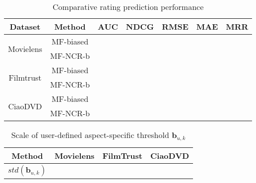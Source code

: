 \documentclass[letterpaper]{article} %
\begin{document}
\begin{table}[htp]
\tiny
\caption{Comparative rating prediction performance}
\begin{center}
\begin{tabular}{|c|c|c|c|c|c|c|}
\hline
Dataset & Method & AUC & NDCG & RMSE & MAE & MRR \\\hline
\multirow{2}{*}{Movielens} & MF-biased &  & 	 &	 &	 &	
 \\\cline{2-7}
 & MF-NCR-b & & 	 &	 &	 &	
 \\\hline
\multirow{2}{*}{Filmtrust} & MF-biased & &	 &	 	&  &	
 \\\cline{2-7}
 & MF-NCR-b &  & 	 &	 & 	 & 	
\\\hline
 \multirow{2}{*}{CiaoDVD} & MF-biased & & 	 &	 & 	 	 &
\\\cline{2-7}
 & MF-NCR-b & & 	 &	 &	 	&
 \\\hline
\end{tabular}
\end{center}
\label{tab:biasresult}
\end{table}%


\begin{table}[htp]
\caption{Scale of user-defined aspect-specific threshold $\mathbf{b}_{u,k}$}
\begin{center}
\begin{tabular}{|c|c|c|c|}
\hline
Method & Movielens & FilmTrust & CiaoDVD \\\hline
$std(\mathbf{b}_{u,k})$ & & & \\\hline
\end{tabular}
\end{center}
\label{tab:bias}
\end{table}%
\end{document}
